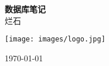 \documentclass[UTF8,a4paper,12pt,autoindent=true,fontset=none,zihao=-4,scheme=chinese,space=auto]{ctexart}
\begin{document}
\begin{titlepage}
    \centering %
    \vspace{2cm} %
    {\Huge \textbf{数据库笔记}} \\
    \vspace{1.5cm}
    {\Large 烂石} \\
    \vspace{2cm}
    \begin{flushleft}
        \centering %
        \texttt{[image: images/logo.jpg]} %
    \end{flushleft}
    \vfill
    {\large \today}
\end{titlepage}












\end{document}
